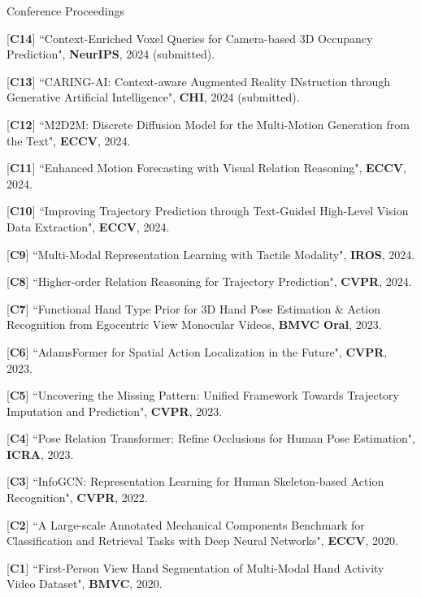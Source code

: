 


\begin{cventries}
\cvpub
{Conference Proceedings} %
{ %
\begin{cvitems}
    \item {[\textbf{C14}] ``Context-Enriched Voxel Queries for Camera-based 3D Occupancy Prediction", \textbf{NeurIPS}, 2024 (submitted).}
    \item {[\textbf{C13}] ``CARING-AI: Context-aware Augmented Reality INstruction through Generative Artificial Intelligence", \textbf{CHI}, 2024 (submitted).}
    \item {[\textbf{C12}] ``M2D2M: Discrete Diffusion Model for the Multi-Motion Generation from the Text", \textbf{ECCV}, 2024.}
    \item {[\textbf{C11}] ``Enhanced Motion Forecasting with Visual Relation Reasoning", \textbf{ECCV}, 2024.}
    \item {[\textbf{C10}] ``Improving Trajectory Prediction through Text-Guided High-Level Vision Data Extraction", \textbf{ECCV}, 2024.}
    \item {[\textbf{C9}] ``Multi-Modal Representation Learning with Tactile Modality", \textbf{IROS}, 2024.}
    \item {[\textbf{C8}] ``Higher-order Relation Reasoning for Trajectory Prediction", \textbf{CVPR}, 2024.}
    \item {[\textbf{C7}] ``Functional Hand Type Prior for 3D Hand Pose Estimation \& Action Recognition from Egocentric View Monocular Videos, \textbf{BMVC Oral}, 2023.}
    \item {[\textbf{C6}] ``AdamsFormer for Spatial Action Localization in the Future", \textbf{CVPR}, 2023.}
    \item {[\textbf{C5}] ``Uncovering the Missing Pattern: Unified Framework Towards Trajectory Imputation and Prediction", \textbf{CVPR}, 2023.}
    \item {[\textbf{C4}] ``Pose Relation Transformer: Refine Occlusions for Human Pose Estimation", \textbf{ICRA}, 2023.}
    \item {[\textbf{C3}] ``InfoGCN: Representation Learning for Human Skeleton-based Action Recognition", \textbf{CVPR}, 2022.}
    \item {[\textbf{C2}] ``A Large-scale Annotated Mechanical Components Benchmark for Classification and Retrieval Tasks with Deep Neural Networks", \textbf{ECCV}, 2020.}
    \item {[\textbf{C1}] ``First-Person View Hand Segmentation of Multi-Modal Hand Activity Video Dataset", \textbf{BMVC}, 2020.}
\end{cvitems}
}



\end{cventries}
